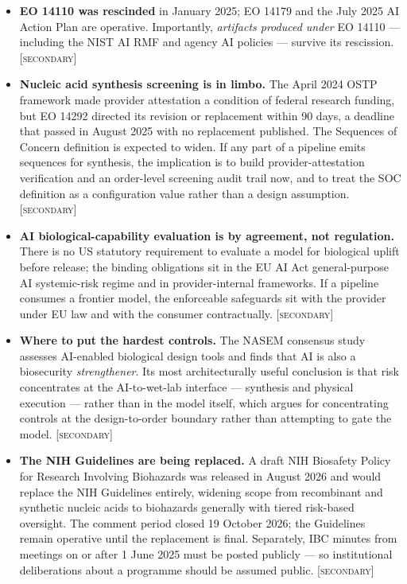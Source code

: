 \documentclass[11pt,a4paper]{article}
\newcommand{\flag}[1]{\textcolor{flagcolor}{\textbf{#1}}}
\newcommand{\secondary}{\textsc{[secondary]}}
\begin{document}
\begin{itemize}
  \item \flag{EO 14110 was rescinded} \citep{eo14110} in January 2025;
  EO 14179 and the July 2025 AI Action Plan \citep{aiactionplan2025} are
  operative. Importantly, \emph{artifacts produced under} EO 14110 ---
  including the NIST AI RMF and agency AI policies --- survive its
  rescission. \secondary

  \item \flag{Nucleic acid synthesis screening is in limbo.} The April 2024
  OSTP framework \citep{nucleicacid2024} made provider attestation a
  condition of federal research funding, but EO 14292 directed its revision
  or replacement within 90 days, a deadline that passed in August 2025 with
  no replacement published. The Sequences of Concern definition is expected
  to widen. If any part of a pipeline emits sequences for synthesis, the
  implication is to build provider-attestation verification and an
  order-level screening audit trail now, and to treat the SOC definition as
  a configuration value rather than a design assumption. \secondary

  \item \textbf{AI biological-capability evaluation is by agreement, not
  regulation.} There is no US statutory requirement to evaluate a model for
  biological uplift before release; the binding obligations sit in the EU AI
  Act general-purpose AI systemic-risk regime and in provider-internal
  frameworks. If a pipeline consumes a frontier model, the enforceable
  safeguards sit with the provider under EU law and with the consumer
  contractually. \secondary

  \item \textbf{Where to put the hardest controls.} The NASEM consensus
  study \citep{nasem2025ai} assesses AI-enabled biological design tools and
  finds that AI is also a biosecurity \emph{strengthener}. Its most
  architecturally useful conclusion is that risk concentrates at the
  AI-to-wet-lab interface --- synthesis and physical execution --- rather
  than in the model itself, which argues for concentrating controls at the
  design-to-order boundary rather than attempting to gate the model.
  \secondary

  \item \flag{The NIH Guidelines are being replaced.} A draft NIH Biosafety
  Policy for Research Involving Biohazards \citep{nihdraftbiosafety2026} was
  released in August 2026 and would replace the NIH Guidelines
  \citep{nihguidelines} entirely, widening scope from recombinant and
  synthetic nucleic acids to biohazards generally with tiered risk-based
  oversight. The comment period closed 19 October 2026; the Guidelines
  remain operative until the replacement is final. Separately, IBC minutes
  from meetings on or after 1 June 2025 must be posted publicly --- so
  institutional deliberations about a programme should be assumed public.
  \secondary
\end{itemize}
\end{document}
